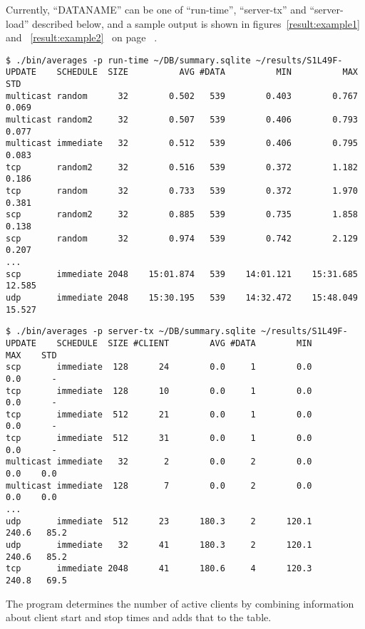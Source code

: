 \documentclass[a4paper,11pt,twocolumn]{article}
\newcommand{\pref}[1]{%
\ref{#1}%
\ifnum\thepage=0\pageref{#1}\else\ on page~\pageref{#1}\fi%
}
\begin{document}
Currently, ``DATA{\textunderscore}NAME'' can be one of ``run-time'',
``server-tx'' and ``server-load'' described below, and a sample output
is shown in figures~\ref{result:example1} and~\pref{result:example2}.
\begin{figure*}[p]
\begin{small}
\begin{verbatim}
$ ./bin/averages -p run-time ~/DB/summary.sqlite ~/results/S1L49F-
UPDATE    SCHEDULE  SIZE          AVG #DATA          MIN          MAX      STD
multicast random      32        0.502   539        0.403        0.767    0.069
multicast random2     32        0.507   539        0.406        0.793    0.077
multicast immediate   32        0.512   539        0.406        0.795    0.083
tcp       random2     32        0.516   539        0.372        1.182    0.186
tcp       random      32        0.733   539        0.372        1.970    0.381
scp       random2     32        0.885   539        0.735        1.858    0.138
scp       random      32        0.974   539        0.742        2.129    0.207
...
scp       immediate 2048    15:01.874   539    14:01.121    15:31.685   12.585
udp       immediate 2048    15:30.195   539    14:32.472    15:48.049   15.527
\end{verbatim}
\end{small}
\caption{Example experiment result}
\label{result:example1}
\end{figure*}
\begin{figure*}[p]
\begin{small}
\begin{verbatim}
$ ./bin/averages -p server-tx ~/DB/summary.sqlite ~/results/S1L49F-
UPDATE    SCHEDULE  SIZE #CLIENT        AVG #DATA        MIN        MAX    STD
scp       immediate  128      24        0.0     1        0.0        0.0      -
tcp       immediate  128      10        0.0     1        0.0        0.0      -
tcp       immediate  512      21        0.0     1        0.0        0.0      -
tcp       immediate  512      31        0.0     1        0.0        0.0      -
multicast immediate   32       2        0.0     2        0.0        0.0    0.0
multicast immediate  128       7        0.0     2        0.0        0.0    0.0
...
udp       immediate  512      23      180.3     2      120.1      240.6   85.2
udp       immediate   32      41      180.3     2      120.1      240.6   85.2
tcp       immediate 2048      41      180.6     4      120.3      240.8   69.5
\end{verbatim}
\end{small}
\caption{Example experiment result}
\label{result:example2}
\end{figure*}
The program determines the number of active clients by combining information
about client start and stop times and adds that to the table.
\end{document}

